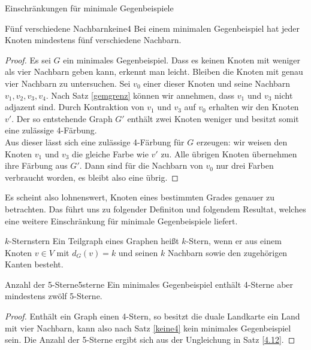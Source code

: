 \begin{section}{Einschränkungen für minimale Gegenbeispiele}
 \begin{satzl}{Fünf verschiedene Nachbarn}{keine4}
  Bei einem minimalen Gegenbeispiel hat jeder Knoten mindestens fünf verschiedene Nachbarn.
 \end{satzl}
 \begin{proof}
  Es sei $G$ ein minimales Gegenbeispiel. Dass es keinen Knoten mit weniger als vier Nachbarn geben kann, erkennt man leicht. Bleiben die Knoten mit genau vier Nachbarn zu untersuchen. Sei $v_0$ einer dieser Knoten und seine Nachbarn $v_1,v_2,v_3,v_4$. Nach Satz \ref{gemgrenz} können wir annehmen, dass $v_1$ und $v_3$ nicht adjazent sind. Durch Kontraktion von $v_1$ und $v_3$ auf $v_0$ erhalten wir den Knoten $v'$. Der so entstehende Graph $G'$ enthält zwei Knoten weniger und besitzt somit eine zulässige 4-Färbung.\\
  Aus dieser lässt sich eine zulässige 4-Färbung für $G$ erzeugen: wir weisen den Knoten $v_1$ und $v_3$ die gleiche Farbe wie $v'$ zu. Alle übrigen Knoten übernehmen ihre Färbung aus $G'$. Dann sind für die Nachbarn von $v_0$ nur drei Farben verbraucht worden, es bleibt also eine übrig.
 \end{proof}
 
 Es scheint also lohnenswert, Knoten eines bestimmten Grades genauer zu betrachten. Das führt uns zu folgender Definiton und folgendem Resultat, welches eine weitere Einschränkung für minimale Gegenbeispiele liefert.
 
 \begin{definitionl}{$k$-Stern}{stern}
  Ein Teilgraph eines Graphen heißt $k$-Stern, wenn er aus einem Knoten $v \in V$ mit $d_G(v) = k$ und seinen $k$ Nachbarn sowie den zugehörigen Kanten besteht.
 \end{definitionl}
 
 \begin{satzl}{Anzahl der 5-Sterne}{5sterne}
  Ein minimales Gegenbeispiel enthält 4-Sterne aber mindestens zwölf 5-Sterne.
 \end{satzl}
 \begin{proof}
  Enthält ein Graph einen 4-Stern, so besitzt die duale Landkarte ein Land mit vier Nachbarn, kann also nach Satz \ref{keine4} kein minimales Gegenbeispiel sein. Die Anzahl der 5-Sterne ergibt sich aus der Ungleichung in Satz \ref{4.12}.
 \end{proof}


\end{section}